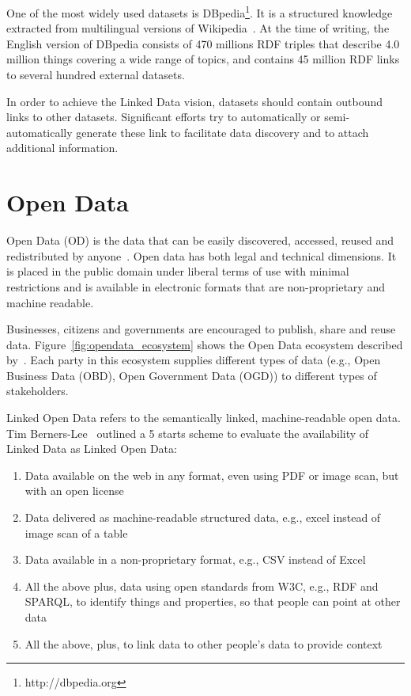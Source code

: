 One of the most widely used datasets is DBpedia\footnote{http://dbpedia.org}. It is a structured knowledge extracted from multilingual versions of Wikipedia~\cite{Bizer:WebSemJorunal:09}. At the time of writing, the English version of DBpedia consists of 470 millions RDF triples that describe 4.0 million things covering a wide range of topics, and contains 45 million RDF links to several hundred external datasets.

In order to achieve the Linked Data vision, datasets should contain outbound links to other datasets. Significant efforts try to automatically or semi-automatically generate these link to facilitate data discovery and to attach additional information.

\section{Open Data}\label{section:openData}

Open Data (OD) is the data that can be easily discovered, accessed, reused and redistributed by anyone~\cite{Davies:Report:15}. Open data has both legal and technical dimensions. It is placed in the public domain under liberal terms of use with minimal restrictions and is available in electronic formats that are non-proprietary and machine readable.

Businesses, citizens and governments are encouraged to publish, share and reuse data. Figure~\ref{fig:opendata_ecosystem} shows the Open Data ecosystem described by~\cite{Deloitte:Report:12}. Each party in this ecosystem supplies different types of data (e.g., Open Business Data (OBD), Open Government Data (OGD)) to different types of stakeholders.

\begin{figure}[ht!]
\end{figure}

Linked Open Data refers to the semantically linked, machine-readable open data. Tim Berners-Lee~\cite{Berners-Lee:W3C:06} outlined a 5 starts scheme to evaluate the availability of Linked Data as Linked Open Data:

\begin{enumerate}
	\item Data available on the web in any format, even using PDF or image scan, but with an open license
	\item Data delivered as machine-readable structured data, e.g., excel instead of image scan of a table
	\item Data available in a non-proprietary format, e.g., CSV instead of Excel
	\item All the above plus, data using open standards from W3C, e.g., RDF and SPARQL, to identify things and properties, so that people can point at other data
	\item All the above, plus, to link data to other people's data to provide context
\end{enumerate}


